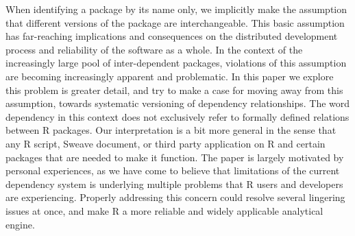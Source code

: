 When identifying a package by its name only, we implicitly make the assumption that 
different versions of the package are
interchangeable. This basic assumption has far-reaching implications and
consequences on the distributed development process and reliability of the
software as a whole. In the context of the increasingly large pool of
inter-dependent packages, violations of this assumption are becoming
increasingly apparent and problematic. In this paper we explore this problem is
greater detail, and try to make a case for moving away from this assumption,
towards systematic versioning of dependency relationships.
The word dependency in this context does not exclusively refer to formally
defined relations between R packages. Our interpretation is a bit more general in
the sense that any R script, Sweave document, or third party application
 on R and certain packages that are needed to make it function.
The paper is largely motivated by personal experiences, as we have come to
believe that limitations of the current dependency system is underlying
multiple problems that R users and developers are experiencing. Properly
addressing this concern could resolve several lingering issues at once,
and make R a more reliable and widely applicable analytical engine.




%
%
%













